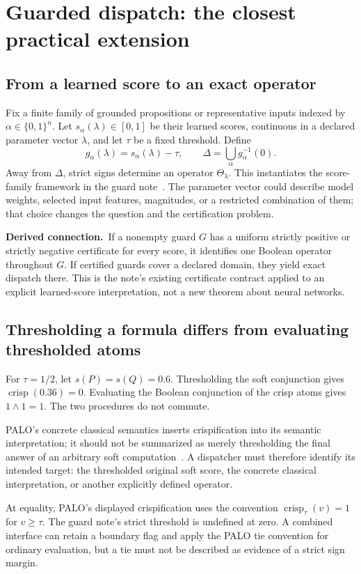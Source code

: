 \documentclass[11pt,a4paper]{article}
\theoremstyle{remark}
\newcommand{\B}{\{0,1\}}
\newcommand{\crisp}{\operatorname{crisp}}
\newcommand{\derived}{\textbf{Derived connection.}\ }
\begin{document}
\section{Guarded dispatch: the closest practical extension}
\subsection{From a learned score to an exact operator}
Fix a finite family of grounded propositions or representative inputs indexed by $\alpha\in\B^n$. Let $s_\alpha(\lambda)\in[0,1]$ be their learned scores, continuous in a declared parameter vector $\lambda$, and let $\tau$ be a fixed threshold. Define
\[
 g_\alpha(\lambda)=s_\alpha(\lambda)-\tau,
 \qquad
 \Delta=\bigcup_\alpha g_\alpha^{-1}(0).
\]
Away from $\Delta$, strict signs determine an operator $\Theta_\lambda$. This instantiates the score-family framework in the guard note~\cite[Section 2]{guard}. The parameter vector could describe model weights, selected input features, magnitudes, or a restricted combination of them; that choice changes the question and the certification problem.

\derived If a nonempty guard $G$ has a uniform strictly positive or strictly negative certificate for every score, it identifies one Boolean operator throughout $G$. If certified guards cover a declared domain, they yield exact dispatch there. This is the note's existing certificate contract applied to an explicit learned-score interpretation, not a new theorem about neural networks.

\subsection{Thresholding a formula differs from evaluating thresholded atoms}
For $\tau=1/2$, let $s(P)=s(Q)=0.6$. Thresholding the soft conjunction gives $\crisp(0.36)=0$. Evaluating the Boolean conjunction of the crisp atoms gives $1\wedge1=1$. The two procedures do not commute.

PALO's concrete classical semantics inserts crispification into its semantic interpretation; it should not be summarized as merely thresholding the final answer of an arbitrary soft computation~\cite[Section 3.7]{palo}. A dispatcher must therefore identify its intended target: the thresholded original soft score, the concrete classical interpretation, or another explicitly defined operator.

At equality, PALO's displayed crispification uses the convention $\crisp_\tau(v)=1$ for $v\ge\tau$. The guard note's strict threshold is undefined at zero. A combined interface can retain a boundary flag and apply the PALO tie convention for ordinary evaluation, but a tie must not be described as evidence of a strict sign margin.
\end{document}
